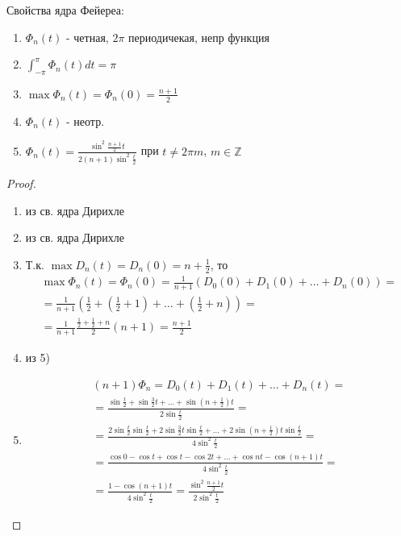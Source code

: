 \documentclass{article}
\begin{document}
Свойства ядра Фейереа:
\begin{enumerate}
  \item $\Phi_n(t)$ - четная, $2\pi$ периодичекая, непр функция
  \item $\int_{-\pi}^{\pi}\Phi_n(t)dt=\pi$
  \item $\max \Phi_n(t)=\Phi_n(0)=\frac{n+1}{2}$
  \item $\Phi_n(t)$ - неотр.
  \item $\Phi_n(t)=\frac{\sin^{2}\frac{n+1}{2}t}{2(n+1)\sin^{2}\frac{t}{2}}$
    при $t\neq 2\pi m$, $m\in \mathbb{Z}$
\end{enumerate}
\begin{proof} \phantom{.}

  \begin{enumerate}
    \item из св. ядра Дирихле
    \item из св. ядра Дирихле
    \item Т.к. $\max D_n(t)=D_n(0)=n+\frac{1}{2}$, то
      \begin{gather*}
        \max \Phi_n(t)=\Phi_n(0)=\frac{1}{n+1}(D_0(0)+D_1(0)+\dots +D_n(0))= \\
        =\frac{1}{n+1}\left(\frac{1}{2}+\left(\frac{1}{2}+1\right)+\dots +\left(\frac{1}{2}+n\right)\right)= \\
        =\frac{1}{n+1}\frac{\frac{1}{2}+\frac{1}{2}+n}{2}(n+1)=\frac{n+1}{2}
      \end{gather*}
    \item из 5)
    \item
      \begin{gather*}
        (n+1)\Phi_n=D_0(t)+D_1(t)+\dots +D_n(t)=\\
        =\frac{\sin \frac{t}{2}+\sin \frac{3}{2}t + \dots +\sin(n+\frac{1}{2})t}{2\sin \frac{t}{2}} = \\
        =\frac{2\sin \frac{t}{2} \sin \frac{t}{2}+2\sin\frac{3}{2}t\sin\frac{t}{2}+\dots +2\sin(n+\frac{1}{2})t\sin\frac{t}{2}}{4\sin^{2}\frac{t}{2}} = \\
        =\frac{\cos 0 - \cos t + \cos t - \cos 2t +\dots + \cos nt - \cos (n+1)t}{4\sin^{2}\frac{t}{2}} = \\ 
        =\frac{1-\cos (n+1)t}{4\sin^{2}\frac{t}{2}}=\frac{\sin^{2}\frac{n+1}{2}t}{2\sin^{2}\frac{t}{2}}
      \end{gather*}
  \end{enumerate}
\end{proof}

\end{document}
